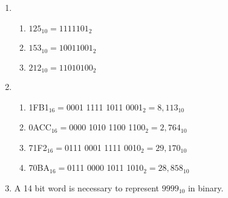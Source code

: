 \documentclass[a4paper]{article}
\begin{document}
\begin{enumerate}
        \newpage
        
        \item
        \begin{enumerate}[label=\alph*)]
            
            \item $125_{10} = 1111101_{2}$

            \item $153_{10} = 10011001_{2}$

            \item $212_{10} = 11010100_{2}$

        \end{enumerate}

        \item
        \begin{enumerate}[label=\alph*)]
            
            \item 1FB1$_{16} = $0001 1111 1011 0001$_2 = 8,113_{10}$

            \item 0ACC$_{16} = $0000 1010 1100 1100$_2 = 2,764_{10}$

            \item 71F2$_{16} = $0111 0001 1111 0010$_2 = 29,170_{10}$
        
            \item 70BA$_{16} = $0111 0000 1011 1010$_2 = 28,858_{10}$

        \end{enumerate}

        \item
        A 14 bit word is necessary to represent $9999_{10}$ in binary.

    \end{enumerate}
\end{document}
